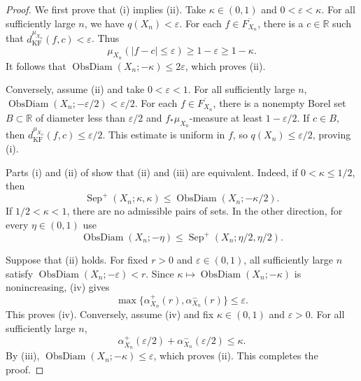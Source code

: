 \documentclass{amsart}
\theoremstyle{plain}
\theoremstyle{definition}
\theoremstyle{remark}
\newcommand{\R}{\mathbb{R}}
\DeclareMathOperator{\od}{ObsDiam}
\begin{document}
\begin{proof}
We first prove that \textup{(i)} implies \textup{(ii)}.  Take
$\kappa\in(0,1)$ and $0<\varepsilon<\kappa$.  For all sufficiently large
$n$, we have $q(X_n)<\varepsilon$.  For each
$f\in\overline{F_{X_n}}$, there is a $c\in\R$ such that
$d_{\mathrm{KF}}^{\mu_{X_n}}(f,c)<\varepsilon$.  Thus
\[
\mu_{X_n}(|f-c|\leq\varepsilon)
\geq1-\varepsilon\geq1-\kappa.
\]
It follows that $\od(X_n;-\kappa)\leq2\varepsilon$, which proves
\textup{(ii)}.

Conversely, assume \textup{(ii)} and take $0<\varepsilon<1$.  For all
sufficiently large $n$,
$\od(X_n;-\varepsilon/2)<\varepsilon/2$.  For each
$f\in\overline{F_{X_n}}$, there is a nonempty Borel set $B\subset\R$ of
diameter less than $\varepsilon/2$ and
$f_*\mu_{X_n}$-measure at least $1-\varepsilon/2$.  If $c\in B$, then
$d_{\mathrm{KF}}^{\mu_{X_n}}(f,c)\leq\varepsilon/2$.  This estimate is
uniform in $f$, so $q(X_n)\leq\varepsilon/2$, proving \textup{(i)}.

Parts \textup{(i)} and \textup{(ii)} of
 show that
\textup{(ii)} and \textup{(iii)} are equivalent.  Indeed, if
$0<\kappa\leq1/2$, then
\[
\operatorname{Sep}^+(X_n;\kappa,\kappa)
\leq\od(X_n;-\kappa/2).
\]
If $1/2<\kappa<1$, there are no admissible pairs of sets.  In the other
direction, for every $\eta\in(0,1)$ use
\[
\od(X_n;-\eta)
\leq\operatorname{Sep}^+(X_n;\eta/2,\eta/2).
\]

Suppose that \textup{(ii)} holds.  For fixed $r>0$ and
$\varepsilon\in(0,1)$, all sufficiently large $n$ satisfy
$\od(X_n;-\varepsilon)<r$.  Since
$\kappa\mapsto\od(X_n;-\kappa)$ is nonincreasing,
\textup{(iv)} gives
\[
\max\{\alpha_{X_n}^+(r),\alpha_{X_n}^-(r)\}\leq\varepsilon.
\]
This proves \textup{(iv)}.  Conversely, assume \textup{(iv)} and fix
$\kappa\in(0,1)$ and $\varepsilon>0$.  For all sufficiently large $n$,
\[
\alpha_{X_n}^+(\varepsilon/2)+
\alpha_{X_n}^-(\varepsilon/2)\leq\kappa.
\]
By \textup{(iii)},
$\od(X_n;-\kappa)\leq\varepsilon$, which proves \textup{(ii)}.  This
completes the proof.
\end{proof}
\end{document}
